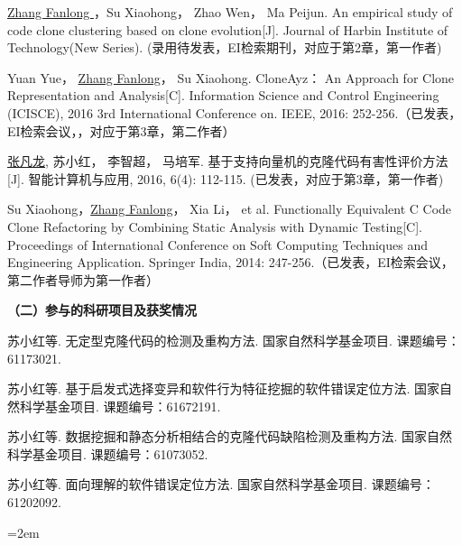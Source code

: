 \begin{publist}
\item
\underline{Zhang Fanlong }，Su Xiaohong， Zhao Wen， Ma Peijun. An empirical study of code clone clustering based on clone evolution[J]. Journal of Harbin Institute of Technology(New Series). (录用待发表，EI检索期刊，对应于第2章，第一作者)
\item
Yuan Yue， \underline{Zhang Fanlong}， Su Xiaohong. CloneAyz： An Approach for Clone Representation and Analysis[C]. Information Science and Control Engineering (ICISCE), 2016 3rd International Conference on. IEEE, 2016: 252-256.（已发表，EI检索会议，，对应于第3章，第二作者）
\item
\underline{张凡龙}, 苏小红， 李智超， 马培军. 基于支持向量机的克隆代码有害性评价方法[J]. 智能计算机与应用, 2016, 6(4): 112-115. (已发表，对应于第3章，第一作者)
\item
Su Xiaohong，\underline{Zhang Fanlong}， Xia Li， et al. Functionally Equivalent C Code Clone Refactoring by Combining Static Analysis with Dynamic Testing[C]. Proceedings of International Conference on Soft Computing Techniques and Engineering Application. Springer India, 2014: 247-256.（已发表，EI检索会议，第二作者导师为第一作者）
\end{publist}




\noindent\textbf{（二）参与的科研项目及获奖情况}
\begin{publist}
\item	
苏小红等. 无定型克隆代码的检测及重构方法. 国家自然科学基金项目. 课题编号：61173021.
\item 
苏小红等. 基于启发式选择变异和软件行为特征挖掘的软件错误定位方法. 国家自然科学基金项目. 课题编号：61672191.
\item
苏小红等. 数据挖掘和静态分析相结合的克隆代码缺陷检测及重构方法. 国家自然科学基金项目. 课题编号：61073052.
\item
苏小红等. 面向理解的软件错误定位方法. 国家自然科学基金项目. 课题编号：61202092.

\end{publist}
\vfill
{}\hangindent=2em\noindent

\setlength{\parindent}{2em}
